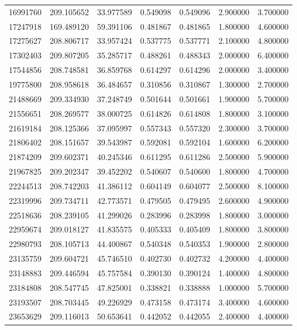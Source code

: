 \begin{tabular}{lrrrrrr}
16991760 & 209.105652 & 33.977589 & 0.549098 & 0.549096 & 2.900000 & 3.700000 \\
17247918 & 169.489120 & 59.391106 & 0.481867 & 0.481865 & 1.800000 & 4.600000 \\
17275627 & 208.806717 & 33.957424 & 0.537775 & 0.537771 & 2.100000 & 4.800000 \\
17302403 & 209.807205 & 35.285717 & 0.488261 & 0.488343 & 2.000000 & 6.400000 \\
17544856 & 208.748581 & 36.859768 & 0.614297 & 0.614296 & 2.000000 & 3.400000 \\
19775800 & 208.958618 & 36.484657 & 0.310856 & 0.310867 & 1.300000 & 2.700000 \\
21488669 & 209.334930 & 37.248749 & 0.501644 & 0.501661 & 1.900000 & 5.700000 \\
21556651 & 208.269577 & 38.000725 & 0.614826 & 0.614808 & 1.800000 & 3.100000 \\
21619184 & 208.125366 & 37.095997 & 0.557343 & 0.557320 & 2.300000 & 3.700000 \\
21806402 & 208.151657 & 39.543987 & 0.592081 & 0.592104 & 1.600000 & 6.200000 \\
21874209 & 209.602371 & 40.245346 & 0.611295 & 0.611286 & 2.500000 & 5.900000 \\
21967825 & 209.202347 & 39.452202 & 0.540607 & 0.540600 & 1.800000 & 4.700000 \\
22244513 & 208.742203 & 41.386112 & 0.604149 & 0.604077 & 2.500000 & 8.100000 \\
22319996 & 209.734711 & 42.773571 & 0.479505 & 0.479495 & 2.600000 & 4.900000 \\
22518636 & 208.239105 & 41.299026 & 0.283996 & 0.283998 & 1.800000 & 3.000000 \\
22959674 & 209.018127 & 41.835575 & 0.405333 & 0.405409 & 1.800000 & 3.800000 \\
22980793 & 208.105713 & 44.400867 & 0.540348 & 0.540353 & 1.900000 & 2.800000 \\
23135759 & 209.604721 & 45.746510 & 0.402730 & 0.402732 & 4.200000 & 4.400000 \\
23148883 & 209.446594 & 45.757584 & 0.390130 & 0.390124 & 1.400000 & 4.800000 \\
23184808 & 208.547745 & 47.825001 & 0.338821 & 0.338888 & 1.000000 & 5.700000 \\
23193507 & 208.703445 & 49.226929 & 0.473158 & 0.473174 & 3.400000 & 4.600000 \\
23653629 & 209.116013 & 50.653641 & 0.442052 & 0.442055 & 2.400000 & 4.400000 \\

\end{tabular}
